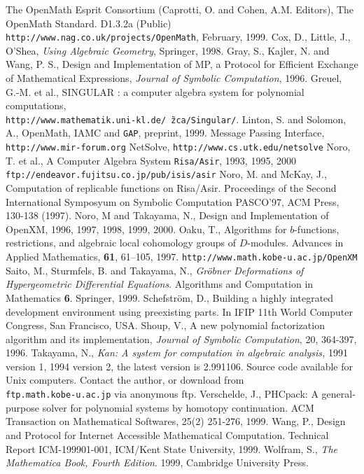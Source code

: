 
\begin{thebibliography}{X}
The OpenMath Esprit Consortium 
(Caprotti, O. and Cohen, A.M. Editors),
The OpenMath Standard. D1.3.2a (Public) \\
{\footnotesize \tt http://www.nag.co.uk/projects/OpenMath},
February, 1999.
Cox, D., Little, J.,  O'Shea,
{\it Using Algebraic Geometry}, Springer, 1998.
Gray, S., Kajler, N. and Wang, P. S.,
Design and Implementation of MP, a Protocol for Efficient
  Exchange of Mathematical Expressions,
{\sl Journal of Symbolic Computation}, 1996.
Greuel, G.-M. et al., SINGULAR : a computer algebra system for polynomial
computations, \\
{\tt http://www.mathematik.uni-kl.de/\~\,zca/Singular/}.
Linton, S. and Solomon, A.,
OpenMath, IAMC and {\tt GAP},
preprint, 1999.
 Message Passing Interface,
{\tt http://www.mir-forum.org} 
NetSolve, {\tt http://www.cs.utk.edu/netsolve}
Noro, T. et al., 
A Computer Algebra System {\tt Risa/Asir},  1993, 1995, 2000\\
{\tt ftp://endeavor.fujitsu.co.jp/pub/isis/asir}
Noro, M. and McKay, J.,
Computation of replicable functions on Risa/Asir.
Proceedings of the Second International Symposyum on
Symbolic Computation PASCO'97, ACM Press, 130-138 (1997).
Noro, M and Takayama, N., Design and Implementation
of OpenXM, 1996, 1997, 1998, 1999, 2000.
Oaku, T.,
Algorithms for $b$-functions, restrictions, and algebraic local cohomology
groups of $D$-modules.
Advances in Applied Mathematics, {\bf 61}, 61--105, 1997.
{\footnotesize {\tt http://www.math.kobe-u.ac.jp/OpenXM}}
Saito, M., Sturmfels, B. and Takayama, N.,
{\it Gr\"obner Deformations of Hypergeometric Differential Equations}.
Algorithms and Computation in Mathematics {\bf 6}. Springer, 1999.
Schefstr\"om, D.,
Building a highly integrated development environment using
preexisting parts.
In IFIP 11th World Computer Congress, San Francisco, USA.
Shoup, V., 
A new polynomial factorization algorithm and 
its implementation,
{\sl Journal of Symbolic Computation}, 20, 364-397, 1996.
	Takayama, N.,
	{\em Kan: A system for computation in
	algebraic analysis,} 1991 version 1,
        1994 version 2, the latest version is 2.991106.
	Source code available for Unix computers. 
         Contact the author, or download from \\
	{\tt \small ftp.math.kobe-u.ac.jp} via anonymous ftp.
Verschelde, J.,
PHCpack: A general-purpose solver for polynomial systems by
homotopy continuation.  ACM Transaction on Mathematical Softwares, 25(2) 
251-276, 1999.
Wang, P.,
Design and Protocol for Internet Accessible Mathematical Computation.
Technical Report ICM-199901-001, ICM/Kent State University, 1999.
Wolfram, S.,
{\it The Mathematica Book, Fourth Edition}.
1999, Cambridge University Press.
\end{thebibliography}
